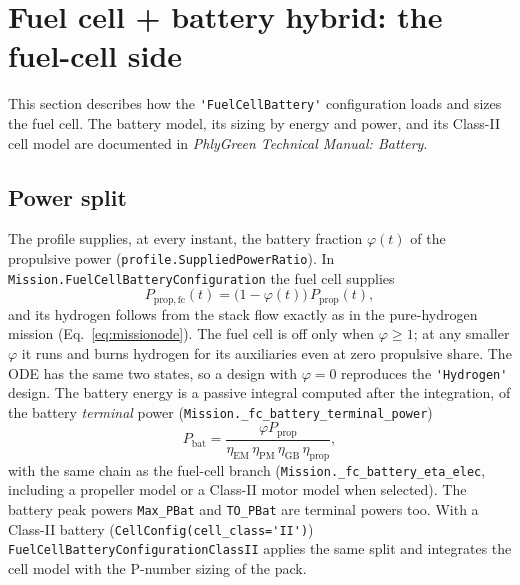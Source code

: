 \documentclass[a4paper,11pt]{article}
\newcommand{\code}[1]{\nolinkurl{#1}}
\newcommand{\fn}[1]{\nolinkurl{#1}}
\begin{document}
\section{Fuel cell + battery hybrid: the fuel-cell side}
\label{sec:fcb}

This section describes how the \code{'FuelCellBattery'} configuration loads and sizes the fuel
cell. The battery model, its sizing by energy and power, and its Class-II cell model are
documented in \emph{PhlyGreen Technical Manual: Battery}.

\subsection{Power split}

The profile supplies, at every instant, the battery fraction $\varphi(t)$ of the propulsive
power (\fn{profile.SuppliedPowerRatio}). In \fn{Mission.FuelCellBatteryConfiguration} the
fuel cell supplies
\begin{equation}
  P_\mathrm{prop,fc}(t) = \big(1-\varphi(t)\big)\,P_\mathrm{prop}(t),
\end{equation}
and its hydrogen follows from the stack flow exactly as in the pure-hydrogen mission
(Eq.~\eqref{eq:missionode}). The fuel cell is off only when $\varphi\ge1$; at any smaller
$\varphi$ it runs and burns hydrogen for its auxiliaries even at zero propulsive share. The ODE
has the same two states, so a design with $\varphi=0$ reproduces the \code{'Hydrogen'} design.
The battery energy is a passive integral computed after the integration, of the battery
\emph{terminal} power (\fn{Mission._fc_battery_terminal_power})
\begin{equation}
  P_\mathrm{bat} = \frac{\varphi P_\mathrm{prop}}{\eta_\mathrm{EM}\,\eta_\mathrm{PM}\,\eta_\mathrm{GB}\,\eta_\mathrm{prop}} ,
\end{equation}
with the same chain as the fuel-cell branch (\fn{Mission._fc_battery_eta_elec}, including a
propeller model or a Class-II motor model when selected). The battery peak powers
\code{Max_PBat} and \code{TO_PBat} are terminal powers too.
With a Class-II battery (\code{CellConfig(cell_class='II')})
\fn{FuelCellBatteryConfigurationClassII} applies the same split and integrates the cell
model with the P-number sizing of the pack.
\end{document}
